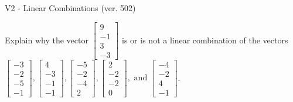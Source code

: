 \begin{exercise}
  \begin{exerciseTitle}V2 - Linear Combinations (ver. 502)\end{exerciseTitle}
  \begin{exerciseStatement}
    Explain why the vector \(\left[\begin{array}{c}
9 \\
-1 \\
3 \\
-3
\end{array}\right]\)  is or is not a linear 
	combination of the vectors \(\left[\begin{array}{c}
-3 \\
-2 \\
-5 \\
-1
\end{array}\right] , \left[\begin{array}{c}
4 \\
-3 \\
-1 \\
-1
\end{array}\right] , \left[\begin{array}{c}
-5 \\
-2 \\
-4 \\
2
\end{array}\right] , \left[\begin{array}{c}
2 \\
-2 \\
-2 \\
0
\end{array}\right] , \text{ and } \left[\begin{array}{c}
-4 \\
-2 \\
4 \\
-1
\end{array}\right]\).
	



\end{exerciseStatement}
\end{exercise}
